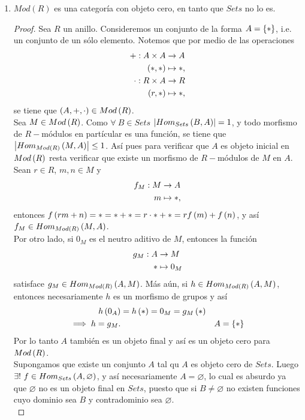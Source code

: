 \documentclass{article}
\begin{document}
\begin{enumerate}[label=\textbf{Ej \arabic*.}]
		\item $Mod(R)$ es una categoría con objeto cero, en tanto que $Sets$ no lo es.
		\begin{proof}
			 Sea $R$ un anillo. Consideremos un conjunto de la forma $A=\left\{*\right\}$, i.e. un conjunto de un sólo elemento. Notemos que por medio de las operaciones
			\begin{align*}
				+: A\times A &\rightarrow A\\ \left(*,*\right) &\mapsto *,\\
				\cdot: R\times A &\rightarrow R\\ \left(r,*\right) &\mapsto *,\\
			\end{align*}
			se tiene que $\left(A,+,\cdot\right)\in Mod\left(R\right)$.\\
			Sea $M\in Mod\left(R\right)$. Como  $\forall\ B\in Sets$ $\left|Hom_{Sets}\left(B,A\right)\right|=1$, y todo morfismo de $R-$módulos en partícular es una función, se tiene que $\left|Hom_{Mod\left(R\right)}\left(M,A\right)\right|\leq 1$. Así pues para verificar que $A$ es objeto inicial en $Mod\left(R\right)$ resta verificar que existe un morfismo de $R-$módulos de $M$ en $A$. Sean $r\in R$, $m,n\in M$ y
			\begin{align*}
				f_M: M &\rightarrow A\\ m &\mapsto *,
			\end{align*}
			entonces $f\left(rm+n\right)=*=*+*=r\cdot*+*=rf\left(m\right)+f\left(n\right)$, y así $f_M\in Hom_{Mod\left(R\right)}\left(M,A\right)$.\\
			Por otro lado, si $0_M$ es el neutro aditivo de $M$, entonces la función
			\begin{align*}
				g_M: A &\rightarrow M\\ * &\mapsto 0_M
			\end{align*}
			satisface $g_M\in Hom_{Mod\left(R\right)}\left(A,M\right)$. Más aún, si $h\in Hom_{Mod\left(R\right)}\left(A,M\right)$, entonces necesariamente $h$ es un morfismo de grupos y así
			\begin{align*}
				h\left(0_A\right)&=h\left(*\right)=0_M=g_M\left(*\right)\\
				\implies h=g_M. && A=\left\{*\right\}
			\end{align*}
			Por lo tanto $A$ también es un objeto final y así es un objeto cero para $Mod\left(R\right)$.\\
			 Supongamos que existe un conjunto $A$ tal qu $A$ es objeto cero de $Sets$. Luego $\exists !\ f\in\ringmodhom{Sets}{A}{\varnothing}$, y así necesariamente $A=\varnothing$, lo cual es absurdo ya que $\varnothing$ no es un objeto final en $Sets$, puesto que si $B\neq \varnothing$ no existen funciones cuyo dominio sea $B$ y contradominio sea $\varnothing$.\\

\end{proof}
\end{enumerate}
\end{document}
